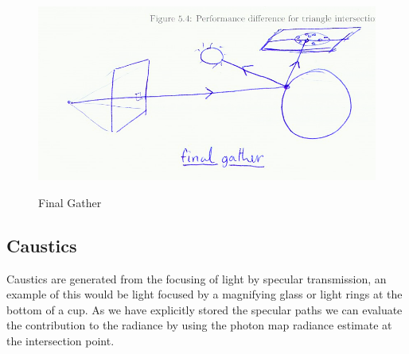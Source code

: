 \begin{figure}
\centering
\includegraphics[width=\textwidth]{./images/final_gather.png}
\label{fig:final_gather}
\caption{Final Gather}
\end{figure}

\subsection{Caustics}
Caustics are generated from the focusing of light by specular transmission, an example of this would be light focused by a magnifying glass or
light rings at the bottom of a cup. As we have explicitly stored the specular paths we can evaluate the contribution to the radiance by
using the photon map radiance estimate at the intersection point.
